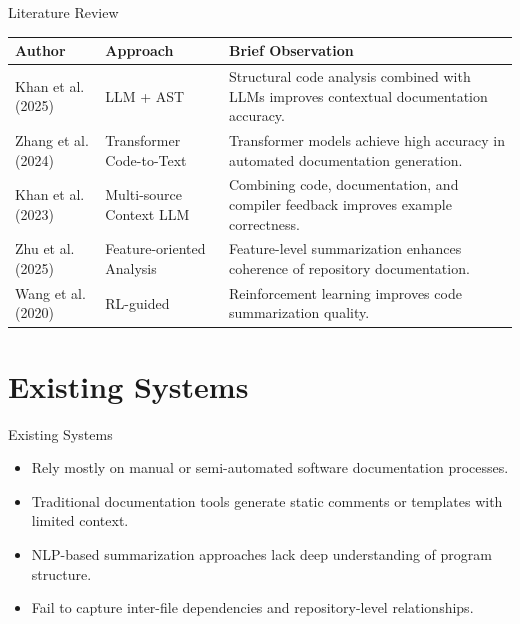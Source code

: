 \documentclass{beamer}
\begin{document}
\begin{frame}{Literature Review}

\begin{tabular}{|p{1.8cm}|p{2.2cm}|p{6.2cm}|}
\hline
\textbf{Author} & \textbf{Approach} & \textbf{Brief Observation} \\
\hline

Khan et al. (2025) &
LLM + AST &
Structural code analysis combined with LLMs improves contextual documentation accuracy. \\
\hline

Zhang et al. (2024) &
Transformer Code-to-Text &
Transformer models achieve high accuracy in automated documentation generation. \\
\hline

Khan et al. (2023) &
Multi-source Context LLM &
Combining code, documentation, and compiler feedback improves example correctness. \\
\hline

Zhu et al. (2025) &
Feature-oriented Analysis &
Feature-level summarization enhances coherence of repository documentation. \\
\hline

Wang et al. (2020) &
RL-guided &
Reinforcement learning improves code summarization quality. \\
\hline

\end{tabular}





\end{frame}


\section{Existing Systems}

\begin{frame}{Existing Systems}
\begin{itemize}
\justifying
\item Rely mostly on manual or semi-automated software documentation processes.
\item Traditional documentation tools generate static comments or templates with limited context.
\item NLP-based summarization approaches lack deep understanding of program structure.
\item Fail to capture inter-file dependencies and repository-level relationships.

\end{itemize}
\end{frame}
\end{document}
